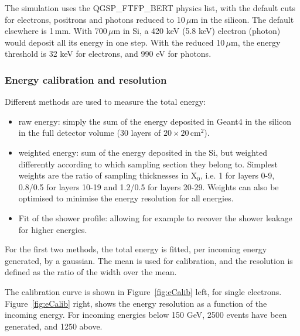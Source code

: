 The simulation uses the QGSP\_FTFP\_BERT physics list, with the default cuts
for electrons, positrons and photons reduced to 10\,$\mu$m in the
silicon. The default elsewhere is 1\,mm. With 700\,$\mu$m in Si,
a 420 keV (5.8 keV) electron (photon) would deposit all its energy in
one step. With the reduced 10\,$\mu$m, the energy threshold is 32 keV
for electrons, and 990 eV for photons.


\subsubsection{Energy calibration and resolution}

Different methods are used to measure the total energy:
\begin{itemize}
\item raw energy: simply the sum of the energy deposited in Geant4 in
  the silicon in the full detector volume (30 layers of $20 \times
  20$\,cm$^2$).
\item weighted energy: sum of the energy deposited in the Si, but
  weighted differently according to which sampling section they belong
  to. Simplest weights are the ratio of sampling thicknesses in X$_0$,
  i.e. 1 for layers 0-9, 0.8/0.5 for layers 10-19 and 1.2/0.5 for
  layers 20-29. Weights can also be optimised to minimise the energy
  resolution for all energies.
\item Fit of the shower profile: allowing for example to recover the
  shower leakage for higher energies.
\end{itemize}

For the first two methods, the total energy is fitted, per incoming
energy generated, by a gaussian. The mean is used for calibration, and
the resolution is defined as the ratio of the width over the mean.

The calibration curve is shown in Figure~\ref{fig:eCalib} left, for
single electrons. Figure~\ref{fig:eCalib} right, shows the energy
resolution as a function of the incoming energy. For incoming energies
below 150 GeV, 2500 events have been generated, and 1250 above.

